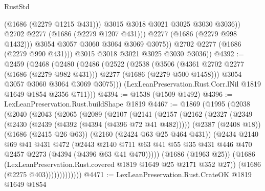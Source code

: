 \begin{lexlean}{RustStd}
\begin{coremodule}
                        (@1686 (@2279 @1215 @431)))
                      @3015
                      @3018
                      @3021
                      @3025
                      @3030
                      @3036))
                  @2702
                  @2277
                  (@1686 (@2279 @1207 @431)))
                @2277
                (@1686 (@2279 @998 @1432)))
              @3054
              @3057
              @3060
              @3064
              @3069
              @3075))
          @2702
          @2277
          (@1686 (@2279 @990 @431)))
        @3015
        @3018
        @3021
        @3025
        @3030
        @3036))
@4392 := @2459
    (@2468
      (@2480
        (@2486
          (@2522
            (@2538
              (@3506 (@4361 @2702 @2277 (@1686 (@2279 @982 @431))) @2277 (@1686 (@2279 @500 @1458)))
              @3054
              @3057
              @3060
              @3064
              @3069
              @3075)))
        (LexLeanPreservation.Rust.Corr.lNil @1819 @1649 @1854 @2356 @711)))
@4394 := @1538 (@1509 @1492)
@4396 := LexLeanPreservation.Rust.buildShape @1819
@4467 := @1869
    (@1995
      (@2038
        (@2040
          (@2043
            (@2065
              (@2089
                (@2107
                  (@2141
                    (@2157
                      (@2162
                        (@2327
                          (@2349
                            (@2430 (@2439 (@4392 (@4394 (@4396 @72 @41 @482)))))
                            (@2387 (@2408 @18))
                            (@1686 (@2415 @26 @63))
                            (@2160 (@2424 @63 @25 @464 @431))
                            (@2434
                              @2140
                              @69
                              @41
                              @431
                              @472
                              (@2443
                                @2140
                                @711
                                @63
                                @41
                                @55
                                @35
                                @431
                                @446
                                @470
                                @2457
                                @2273
                                (@4394 (@4396 @63 @41 @470)))))
                          (@1686 (@1963 @25))
                          (@1686 (LexLeanPreservation.Rust.covered @1819 @1649 @25 @2171 @352 @27))
                          (@1686 (@2275 @403)))))))))))))
@4471 := LexLeanPreservation.Rust.CrateOK @1819 @1649 @1854

\end{coremodule}
\end{lexlean}
